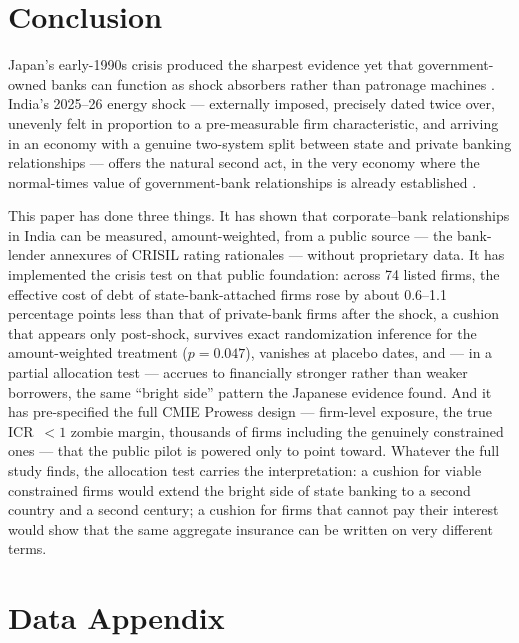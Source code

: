 \documentclass[12pt]{article}
\begin{document}
\section{Conclusion}\label{sec:conclusion}

Japan's early-1990s crisis produced the sharpest evidence yet that government-owned banks
can function as shock absorbers rather than patronage machines
\citep{lin2015government}. India's 2025--26 energy shock --- externally imposed, precisely
dated twice over, unevenly felt in proportion to a pre-measurable firm characteristic, and
arriving in an economy with a genuine two-system split between state and private banking
relationships --- offers the natural second act, in the very economy where the normal-times value of
government-bank relationships is already established \citep{srinivasan2017}.

This paper has done three things. It has shown that corporate--bank relationships in India
can be measured, amount-weighted, from a public source --- the bank-lender annexures of
CRISIL rating rationales --- without proprietary data. It has implemented the crisis test
on that public foundation: across 74 listed firms, the effective cost of debt of
state-bank-attached firms rose by about 0.6--1.1 percentage points less than that of
private-bank firms after the shock, a cushion that appears only post-shock, survives exact
randomization inference for the amount-weighted treatment ($p=0.047$), vanishes at placebo
dates, and --- in a partial allocation test --- accrues to financially stronger rather than
weaker borrowers, the same ``bright side'' pattern the Japanese evidence found. And it has
pre-specified the full CMIE Prowess design --- firm-level exposure, the true ICR~$<1$
zombie margin, thousands of firms including the genuinely constrained ones --- that the
public pilot is powered only to point toward. Whatever the full study finds, the allocation
test carries the interpretation: a cushion for viable constrained firms would extend the
bright side of state banking to a second country and a second century; a cushion for firms
that cannot pay their interest would show that the same aggregate insurance can be written
on very different terms.

\newpage


\newpage
\appendix
\section*{Data Appendix}
\end{document}
